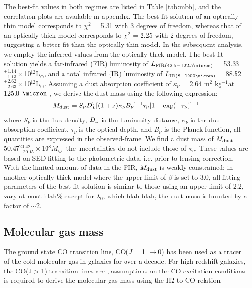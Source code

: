 \documentclass[twocolumn,apj,numberedappendix]{emulateapj}
\newcommand{\Msun}{\mbox{$M_{\odot}$}}
\newcommand{\Lsun}{\mbox{L$_{\odot}$}}
\newcommand{\rarr}{$\rightarrow$}
\newcommand{\pmOne}{$^{-1}$}
\begin{document}

The best-fit values in both regimes are listed in Table \ref{tab:mbb}, and the correlation plots are available in appendix. The best-fit solution of an optically thin
model corresponds to $\chi^2$ = 5.31 with 3 degrees of freedom, whereas that of an optically thick model
corresponds to $\chi^2$ = 2.25 with 2 degrees of freedom, suggesting a better fit than the optically thin
model. In the subsequent analysis, we employ the inferred values from the optically thick model.
The best-fit solution yields a far-infrared (FIR) luminosity of $L_{\rm FIR (42.5-122.5\micron)}$ = 53.33$^{+1.14}_{-1.13}\times$10$^{12}$\Lsun, and a total infrared (IR) luminosity of $L_{\rm IR (8-1000 \micron)}$ = 88.52$^{+2.62}_{-2.63}\times$10$
^{12}$\Lsun. Assuming a dust absorption coefficient of $\kappa_{\nu}$ = 2.64 m$^2$ kg\pmOne at 125.0 $
\micron$ \citep{Dunne03a}, we derive the dust mass using the following expression:
\begin{equation}
M_{\rm dust} = S_{\nu} D_{L}^2 [(1 + z) \kappa_{\nu} B_{\nu}]^{-1} \tau_{\nu} [1-
\exp(-\tau_{\nu})]^{-1}
\end{equation}
where $S_{\nu}$ is the flux density, $D_{\rm L}$ is the luminosity distance, $\kappa_{\nu}$ is the dust
absorption coefficient, $\tau_{\nu}$ is the optical depth, and $B_{\nu}$ is the Planck function,
all quantities are expressed in the observed-frame. We find a dust mass of $M_{\rm dust}$ =
50.47$^{20.42}_{-20.15}\times$10$^8$\Msun, the uncertainties do not include those of $\kappa_{\nu}$. These values are based on SED fitting to the photometric data, i.e. prior
to lensing correction.
With the limited amount of data in the FIR, $M_{\rm dust}$ is weakly constrained; in another optically thick model where the upper limit of $\beta$ is set to 3.0, all fitting parameters of the best-fit solution is similar to those using an upper limit of 2.2, vary at most blah\% except for $\lambda_0$, which blah blah, the dust mass is boosted by a factor of $\sim$2. 

\subsection{Molecular gas mass}
The ground state CO transition line, CO($J$ = 1 \rarr 0) has been used as a tracer of the cold molecular gas in galaxies for over a decade. For high-redshift galaxies, the CO(J$>$1) transition lines are  
, assumptions on the CO excitation conditions is required to derive the molecular gas mass using the H2 to CO relation. 
\end{document}
